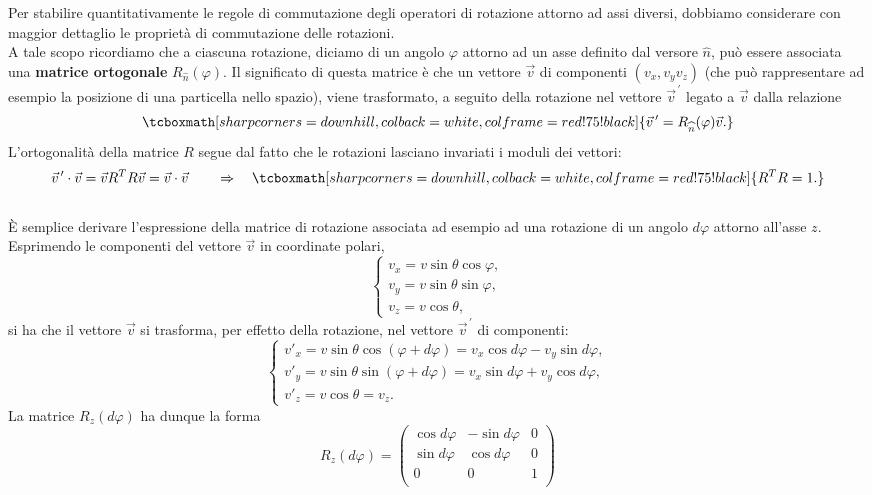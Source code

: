 \documentclass[a4paper,12pt,oneside]{book}
\begin{document}
Per stabilire quantitativamente le regole di commutazione degli operatori di rotazione attorno ad assi diversi, dobbiamo considerare con maggior dettaglio le proprietà di commutazione delle rotazioni.\\

A tale scopo ricordiamo che a ciascuna rotazione, diciamo di un angolo $\varphi$ attorno ad un asse definito dal versore $\widehat{n}$, può essere associata una \textbf{matrice ortogonale} $R_{\widehat{n}} (\varphi)$. Il significato di questa matrice è che un vettore $\vec{v}$ di componenti $(v_x, v_y v_z) $ (che può rappresentare ad esempio la posizione di una particella nello spazio), viene trasformato, a seguito della rotazione nel vettore $\vec{v}^{\, \prime}$ legato a $\vec{v}$ dalla relazione
	\begin{equation}
		\tcboxmath[sharp corners=downhill, colback=white, colframe=red!75!black]{
			\vec{v}^{\, \prime}= R_{\widehat{n}} (\varphi)\vec{v}.
			}
	\end{equation}
L'ortogonalità della matrice $R$ segue dal fatto che le rotazioni lasciano invariati i moduli dei vettori:
	\begin{equation}
		\vec{v}^{\, \prime}\cdot\vec{v} = \vec{v}R^T R \vec{v}= \vec{v}\cdot\vec{v} \qquad \Rightarrow \quad
		\tcboxmath[sharp corners=downhill, colback=white, colframe=red!75!black]{
 		R^T R =1.
 		}
	\end{equation}\\
	
È semplice derivare l'espressione della matrice di rotazione associata ad esempio ad una rotazione di un angolo $d\varphi $ attorno all'asse $z$. Esprimendo le componenti del vettore $\vec{v}$ in coordinate polari,
	\begin{equation}
		\begin{cases}
			v_x = v \sin\theta \cos \varphi ,\\
			v_y = v \sin\theta \sin \varphi ,\\
			v_z = v \cos\theta ,
		\end{cases}
	\end{equation}
si ha che il vettore $\vec{v}$ si trasforma, per effetto della rotazione, nel vettore $\vec{v}^{\, \prime}$ di componenti:
	\begin{equation}
		\begin{cases}
			v'_x = v \sin\theta \cos (\varphi +d\varphi )= v_x \cos d\varphi - v_y \sin d\varphi ,\\
			v'_y = v \sin\theta \sin (\varphi +d\varphi ) = v_x \sin d\varphi + v_y \cos d\varphi ,\\
			v'_z = v \cos\theta = v_z .
	\end{cases}
	\end{equation}
La matrice $R_z (d\varphi)$ ha dunque la forma
	\begin{equation}
		R_z (d\varphi)=
		\begin{pmatrix}
			\cos d\varphi & -\sin d\varphi & 0\\
			\sin d\varphi & \cos d\varphi & 0 \\
			0 & 0 & 1 \\
		\end{pmatrix}
	\end{equation}\\
	
\end{document}
